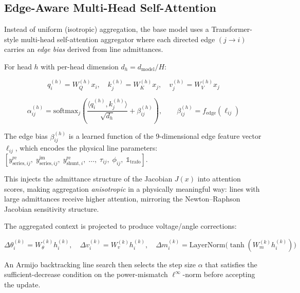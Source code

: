 \documentclass{article}
\begin{document}
\subsection{Edge-Aware Multi-Head Self-Attention}

Instead of uniform (isotropic) aggregation, the base model uses a
Transformer-style multi-head self-attention aggregator where each directed
edge $(j \to i)$ carries an \emph{edge bias} derived from line admittances.

For head $h$ with per-head dimension $d_h = d_{\mathrm{model}} / H$:

\begin{equation}
  q_i^{(h)} = W_Q^{(h)} x_i, \quad
  k_j^{(h)} = W_K^{(h)} x_j, \quad
  v_j^{(h)} = W_V^{(h)} x_j
\end{equation}

\begin{equation}
  \alpha_{ij}^{(h)}
  =
  \mathrm{softmax}_j
  \!\left(
    \frac{\langle q_i^{(h)}, k_j^{(h)} \rangle}{\sqrt{d_h}}
    + \beta_{ij}^{(h)}
  \right),
  \qquad
  \beta_{ij}^{(h)} = f_{\mathrm{edge}}(\ell_{ij})
\end{equation}

The edge bias $\beta_{ij}^{(h)}$ is a learned function of the
9-dimensional edge feature vector $\ell_{ij}$, which encodes the
physical line parameters:
$[y_{\mathrm{series},ij}^{\mathrm{re}},\; y_{\mathrm{series},ij}^{\mathrm{im}},\;
y_{\mathrm{shunt},i}^{\mathrm{re}},\; \ldots,\; \tau_{ij},\; \phi_{ij},\;
\mathbb{1}_{\mathrm{trafo}}]$.

This injects the admittance structure of the Jacobian $J(x)$ into attention
scores, making aggregation \emph{anisotropic} in a physically meaningful way:
lines with large admittances receive higher attention, mirroring the
Newton--Raphson Jacobian sensitivity structure.

The aggregated context is projected to produce voltage/angle corrections:

\begin{equation}
  \Delta\theta_i^{(k)} = W_\theta^{(k)} h_i^{(k)}, \quad
  \Delta v_i^{(k)} = W_v^{(k)} h_i^{(k)}, \quad
  \Delta m_i^{(k)} = \mathrm{LayerNorm}\!\bigl(\tanh(W_m^{(k)} h_i^{(k)})\bigr)
\end{equation}

An Armijo backtracking line search then selects the step size $\alpha$
that satisfies the sufficient-decrease condition on the power-mismatch
$\ell^\infty$-norm before accepting the update.
\end{document}
